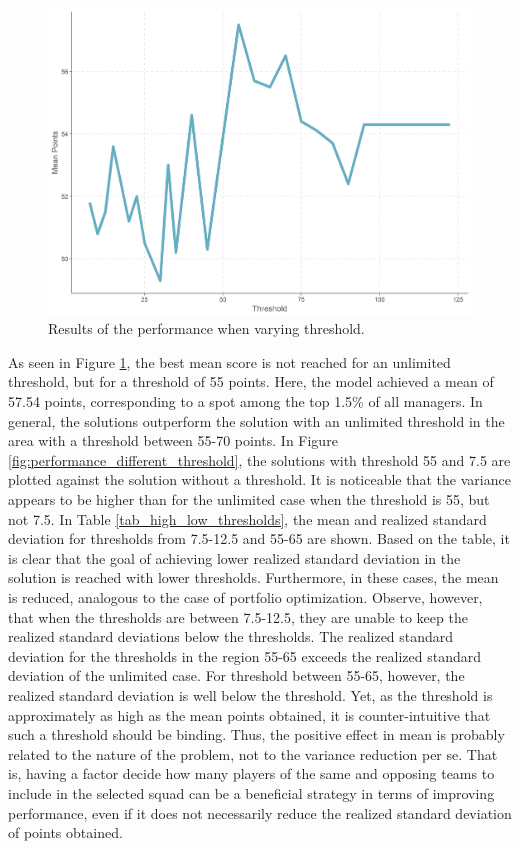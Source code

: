 \begin{figure}[H]
    \centering
    \includegraphics[scale=0.5]{fig/chapter_7/var.png}
    \caption{Results of the performance when varying threshold.}
\label{fig:performance_varying_threshold}    
\end{figure}%


As seen in Figure \ref{fig:performance_varying_threshold}, the best mean score is not reached for an unlimited threshold, but for a threshold of 55 points. Here, the model achieved a mean of 57.54 points, corresponding to a spot among the top 1.5\% of all managers. In general, the solutions outperform the solution with an unlimited threshold in the area with a threshold between 55-70 points. In Figure \ref{fig:performance_different_threshold}, the solutions with threshold 55 and 7.5 are plotted against the solution without a threshold. It is noticeable that the variance appears to be higher than for the unlimited case when the threshold is 55, but not 7.5. In Table \ref{tab_high_low_thresholds}, the mean and realized standard deviation for thresholds from 7.5-12.5 and 55-65 are shown. Based on the table, it is clear that the goal of achieving lower realized standard deviation in the solution is reached with lower thresholds. Furthermore, in these cases, the mean is reduced, analogous to the case of portfolio optimization. Observe, however, that when the thresholds are between 7.5-12.5, they are unable to keep the realized standard deviations below the thresholds. The realized standard deviation for the thresholds in the region 55-65 exceeds the realized standard deviation of the unlimited case. For threshold between 55-65, however, the realized standard deviation is well below the threshold. Yet, as the threshold is approximately as high as the mean points obtained, it is counter-intuitive that such a threshold should be binding. Thus, the positive effect in mean is probably related to the nature of the problem, not to the variance reduction per se. That is, having a factor decide how many players of the same and opposing teams to include in the selected squad can be a beneficial strategy in terms of improving performance, even if it does not necessarily reduce the realized standard deviation of points obtained.



